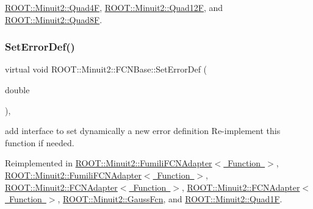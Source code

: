 \mbox{\hyperlink{classROOT_1_1Minuit2_1_1Quad4F_a41964a71fa65445e18c041fbdc724a03}{R\+O\+O\+T\+::\+Minuit2\+::\+Quad4F}}, \mbox{\hyperlink{classROOT_1_1Minuit2_1_1Quad12F_ad68fa5e48b2de950139a1e73a5a0558b}{R\+O\+O\+T\+::\+Minuit2\+::\+Quad12F}}, and \mbox{\hyperlink{classROOT_1_1Minuit2_1_1Quad8F_ade3e6d285a6c3733f9032d6e5c0c0a9b}{R\+O\+O\+T\+::\+Minuit2\+::\+Quad8F}}.

\mbox{\label{classROOT_1_1Minuit2_1_1FCNBase_a840e02c2e6ef96eec289deca096b6088}} 
\subsubsection{\texorpdfstring{SetErrorDef()}{SetErrorDef()}\hspace{0.1cm}{\footnotesize\ttfamily [1/2]}}
{\footnotesize\ttfamily virtual void R\+O\+O\+T\+::\+Minuit2\+::\+F\+C\+N\+Base\+::\+Set\+Error\+Def (\begin{DoxyParamCaption}\item[{double}]{ }\end{DoxyParamCaption})\hspace{0.3cm}{\ttfamily [inline]}, {\ttfamily [virtual]}}

add interface to set dynamically a new error definition Re-\/implement this function if needed. 

Reimplemented in \mbox{\hyperlink{classROOT_1_1Minuit2_1_1FumiliFCNAdapter_a4c854e9ce5324ee557f818ecf5f00fb1}{R\+O\+O\+T\+::\+Minuit2\+::\+Fumili\+F\+C\+N\+Adapter$<$ Function $>$}}, \mbox{\hyperlink{classROOT_1_1Minuit2_1_1FumiliFCNAdapter_a4c854e9ce5324ee557f818ecf5f00fb1}{R\+O\+O\+T\+::\+Minuit2\+::\+Fumili\+F\+C\+N\+Adapter$<$ Function $>$}}, \mbox{\hyperlink{classROOT_1_1Minuit2_1_1FCNAdapter_ad87419db3f1d4764497f52487fef6fc8}{R\+O\+O\+T\+::\+Minuit2\+::\+F\+C\+N\+Adapter$<$ Function $>$}}, \mbox{\hyperlink{classROOT_1_1Minuit2_1_1FCNAdapter_ad87419db3f1d4764497f52487fef6fc8}{R\+O\+O\+T\+::\+Minuit2\+::\+F\+C\+N\+Adapter$<$ Function $>$}}, \mbox{\hyperlink{classROOT_1_1Minuit2_1_1GaussFcn_ad6ab65c15a43f72db27fd6ddf26486f9}{R\+O\+O\+T\+::\+Minuit2\+::\+Gauss\+Fcn}}, and \mbox{\hyperlink{classROOT_1_1Minuit2_1_1Quad1F_a086ed11e56374ff0331676d7eac34395}{R\+O\+O\+T\+::\+Minuit2\+::\+Quad1F}}.

\mbox{\label{classROOT_1_1Minuit2_1_1FCNBase_a840e02c2e6ef96eec289deca096b6088}} 
